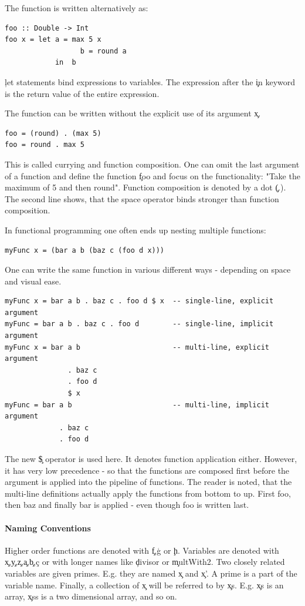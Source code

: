     The function is written alternatively as:
    \begin{lstlisting}
foo :: Double -> Int
foo x = let a = max 5 x
                  b = round a
            in  b
    \end{lstlisting}
    \c{let} statements bind expressions to variables.
    The expression after the \c{in} keyword is the return value of the
    entire expression.
    
    The function can be written without the explicit use of its argument \c{x}.
    \begin{lstlisting}
foo = (round) . (max 5)
foo = round . max 5
    \end{lstlisting}
    This is called currying and function composition.
    One can omit the last argument of a function and define the function
    \c{foo} and focus on the functionality: "Take the maximum of 5 and then round".
    Function composition is denoted by a dot \c{(.)}.
    The second line shows, that the space operator binds stronger than function composition.
    
    In functional programming one often ends up nesting multiple functions:
    \begin{lstlisting}
myFunc x = (bar a b (baz c (foo d x)))
    \end{lstlisting}
    One can write the same function in various different ways - depending on space
    and visual ease.
    \begin{lstlisting}
myFunc x = bar a b . baz c . foo d $ x  -- single-line, explicit argument
myFunc = bar a b . baz c . foo d        -- single-line, implicit argument
myFunc x = bar a b                      -- multi-line, explicit argument
               . baz c 
               . foo d
               $ x
myFunc = bar a b                        -- multi-line, implicit argument
             . baz c
             . foo d
    \end{lstlisting}
    The new \c{\$} operator is used here. It denotes function application either.
    However, it
    has very low precedence - so that the functions are composed first
    before the argument is applied into the pipeline of functions.
    The reader is noted, that the multi-line definitions actually apply
    the functions from bottom to up. First foo, then baz
    and finally bar is applied - even though foo is written last.
    
  \paragraph{Naming Conventions}
    Higher order functions are denoted with \c{f},\c{g} or \c{h}.
    Variables are denoted with \c{x},\c{y},\c{z},\c{a},\c{b},\c{c}
    or with longer names like \c{divisor} or \c{multWith2}.
    Two closely related variables are given
    primes. E.g. they are named \c{x} and \c{x'}. A prime is a part of the variable name.
    Finally, a collection of \c{x} will be referred to by \c{xs}.
    E.g. \c{xs} is an array, \c{xss} is a two dimensional array, and so on.
  
